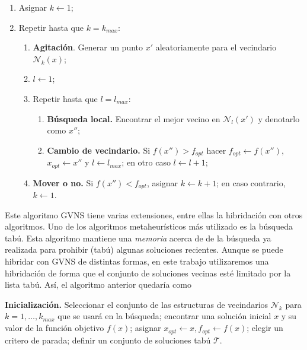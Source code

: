 \documentclass[
]{article}
\providecommand{\tightlist}{%
  \setlength{\itemsep}{0pt}\setlength{\parskip}{0pt}}
\begin{document}
\begin{enumerate}
\def\labelenumi{(\arabic{enumi})}
\tightlist
\item
  Asignar \(k\leftarrow 1\);
\item
  Repetir hasta que \(k=k_{max}\):

  \begin{enumerate}
  \def\labelenumii{(\alph{enumii})}
  \tightlist
  \item
    \textbf{Agitación}. Generar un punto \(x'\) aleatoriamente para el
    vecindario \(\mathcal{N}_k(x)\);
  \item
    \(l\leftarrow 1\);
  \item
    Repetir hasta que \(l=l_{max}\):

    \begin{enumerate}
    \def\labelenumiii{(\roman{enumiii})}
    \tightlist
    \item
      \textbf{Búsqueda local.} Encontrar el mejor vecino en
      \(\mathcal{N}_l(x')\) y denotarlo como \(x''\);
    \item
      \textbf{Cambio de vecindario.} Si \(f(x'') > f_{opt}\) hacer
      \(f_{opt}\leftarrow f(x'')\), \(x_{opt}\leftarrow x''\) y
      \(l\leftarrow l_{max}\); en otro caso \(l\leftarrow l + 1\);
    \end{enumerate}
  \item
    \textbf{Mover o no.} Si \(f(x'') < f_{opt}\), asignar
    \(k \leftarrow k + 1\); en caso contrario, \(k\leftarrow 1\).
  \end{enumerate}
\end{enumerate}

Este algoritmo GVNS tiene varias extensiones, entre ellas la hibridación
con otros algoritmos. Uno de los algoritmos metaheurísticos más
utilizado es la búsqueda tabú. Esta algoritmo mantiene una
\emph{memoria} acerca de de la búsqueda ya realizada para prohibir
(tabú) algunas soluciones recientes. Aunque se puede hibridar con GVNS
de distintas formas, en este trabajo utilizaremos una hibridación de
forma que el conjunto de soluciones vecinas esté limitado por la lista
tabú. Así, el algoritmo anterior quedaría como

\textbf{Inicialización.} Seleccionar el conjunto de las estructuras de
vecindarios \(\mathcal{N}_k\) para \(k=1,\ldots, k_{max}\) que se usará
en la búsqueda; encontrar una solución inicial \(x\) y su valor de la
función objetivo \(f(x)\); asignar
\(x_{opt}\leftarrow x, f_{opt}\leftarrow f(x)\); elegir un critero de
parada; definir un conjunto de soluciones tabú \(\mathcal{T}\).
\end{document}

